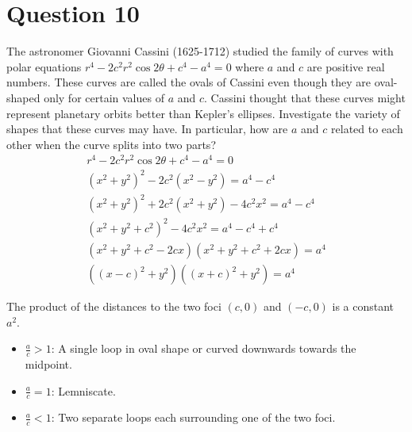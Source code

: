 \documentclass[12pt]{article}
\newcommand{\theorem}[2]{\begin{tcolorbox}[title={#1},colback=blue!5!white,colframe=blue!75!black,parbox=false] #2 \end{tcolorbox}}
\begin{document}
\section{Question 10}
The astronomer Giovanni Cassini (1625-1712) studied the family of curves with polar equations $r^4 - 2c^2r^2 \cos 2\theta + c^4 - a^4 = 0$ where $a$ and $c$ are positive real numbers. These curves are called the ovals of Cassini even though they are oval-shaped only for certain values of $a$ and $c$. Cassini thought that these curves might represent planetary orbits better than Kepler’s ellipses. Investigate the variety of shapes that these curves may have. In particular, how are $a$ and $c$ related to each other when the curve splits into two parts?
\begin{gather*}
    r^4 - 2c^2r^2 \cos 2\theta + c^4 - a^4 =0\\
    (x^2+y^2)^2-2c^2(x^2-y^2)=a^4-c^4\\
    (x^2+y^2)^2+2c^2(x^2+y^2)-4c^2x^2=a^4-c^4\\
    (x^2+y^2+c^2)^2-4c^2x^2=a^4-c^4+c^4\\
    (x^2+y^2+c^2-2cx)(x^2+y^2+c^2+2cx)=a^4\\
    ((x-c)^2+y^2)((x+c)^2+y^2)=a^4
\end{gather*}

The product of the distances to the two foci 
$(c,0)$ and $(-c,0)$ is a constant $a^2$.

\theorem{Oval of Cassini}{
\begin{itemize}
    \item $\frac{a}{c}>1$: A single loop in oval shape or curved downwards towards the midpoint. 
    \item $\frac{a}{c}=1$: Lemniscate.
    \item $\frac{a}{c}<1$: Two separate loops each surrounding one of the two foci.
\end{itemize}
}
\end{document}
